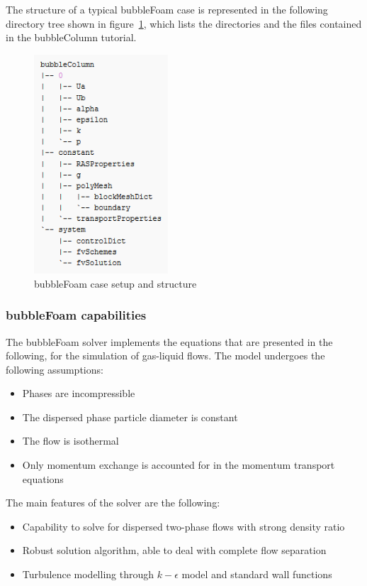 \documentclass[11pt, a4paper, twoside]{article}
\begin{document}
The structure of a typical bubbleFoam case is represented in the following directory tree shown in figure~\ref{fig:bubblefoamstructure}, which lists the directories and the files contained in the bubbleColumn tutorial. 
\begin{figure}[!ht]
 \centering
    \includegraphics[width=50mm,scale=0.5]{figures/bubblefoamstructure.png}
    \caption{bubbleFoam case setup and structure}
    \label{fig:bubblefoamstructure}
\end{figure}

\subsubsection{bubbleFoam capabilities} \label{sec:bubbleFoamcapabilities}
The bubbleFoam solver implements the equations that are presented in the following, for the simulation of gas-liquid flows. The model undergoes the following assumptions:
\begin{itemize}
    \item{Phases are incompressible}
    \item{The dispersed phase particle diameter is constant}
    \item{The flow is isothermal}
    \item{Only momentum exchange is accounted for in the momentum transport equations}
\end{itemize}

The main features of the solver are the following:

\begin{itemize}
    \item{Capability to solve for dispersed two-phase flows with strong density ratio}
    \item{Robust solution algorithm, able to deal with complete flow separation}
    \item{Turbulence modelling through $k-\epsilon$ model and standard wall functions}
\end{itemize}
\end{document}
